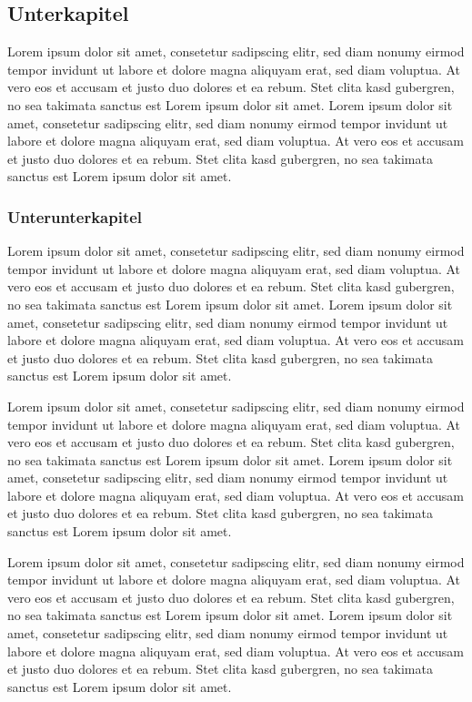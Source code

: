 \documentclass[12pt]{scrartcl}
\begin{document}
\subsection{Unterkapitel}
Lorem ipsum dolor sit amet, consetetur sadipscing elitr, sed diam nonumy eirmod tempor invidunt ut labore et dolore magna aliquyam erat, sed diam voluptua. At vero eos et accusam et justo duo dolores et ea rebum. Stet clita kasd gubergren, no sea takimata sanctus est Lorem ipsum dolor sit amet. Lorem ipsum dolor sit amet, consetetur sadipscing elitr, sed diam nonumy eirmod tempor invidunt ut labore et dolore magna aliquyam erat, sed diam voluptua. At vero eos et accusam et justo duo dolores et ea rebum. Stet clita kasd gubergren, no sea takimata sanctus est Lorem ipsum dolor sit amet.


\subsubsection{Unterunterkapitel}


Lorem ipsum dolor sit amet, consetetur sadipscing elitr, sed diam nonumy eirmod tempor invidunt ut labore et dolore magna aliquyam erat, sed diam voluptua. At vero eos et accusam et justo duo dolores et ea rebum. Stet clita kasd gubergren, no sea takimata sanctus est Lorem ipsum dolor sit amet. Lorem ipsum dolor sit amet, consetetur sadipscing elitr, sed diam nonumy eirmod tempor invidunt ut labore et dolore magna aliquyam erat, sed diam voluptua. At vero eos et accusam et justo duo dolores et ea rebum. Stet clita kasd gubergren, no sea takimata sanctus est Lorem ipsum dolor sit amet.


Lorem ipsum dolor sit amet, consetetur sadipscing elitr, sed diam nonumy eirmod tempor invidunt ut labore et dolore magna aliquyam erat, sed diam voluptua. At vero eos et accusam et justo duo dolores et ea rebum. Stet clita kasd gubergren, no sea takimata sanctus est Lorem ipsum dolor sit amet. Lorem ipsum dolor sit amet, consetetur sadipscing elitr, sed diam nonumy eirmod tempor invidunt ut labore et dolore magna aliquyam erat, sed diam voluptua. At vero eos et accusam et justo duo dolores et ea rebum. Stet clita kasd gubergren, no sea takimata sanctus est Lorem ipsum dolor sit amet.



Lorem ipsum dolor sit amet, consetetur sadipscing elitr, sed diam nonumy eirmod tempor invidunt ut labore et dolore magna aliquyam erat, sed diam voluptua. At vero eos et accusam et justo duo dolores et ea rebum. Stet clita kasd gubergren, no sea takimata sanctus est Lorem ipsum dolor sit amet. Lorem ipsum dolor sit amet, consetetur sadipscing elitr, sed diam nonumy eirmod tempor invidunt ut labore et dolore magna aliquyam erat, sed diam voluptua. At vero eos et accusam et justo duo dolores et ea rebum. Stet clita kasd gubergren, no sea takimata sanctus est Lorem ipsum dolor sit amet.
\end{document}

